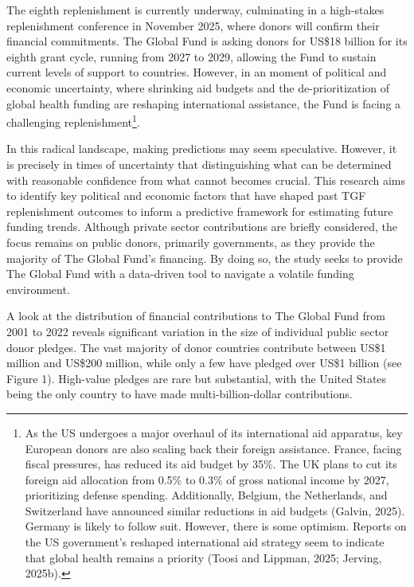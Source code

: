 \documentclass[
]{article}
\begin{document}
The eighth replenishment is currently underway, culminating in a
high-stakes replenishment conference in November 2025, where donors will
confirm their financial commitments. The Global Fund is asking donors
for US\$18 billion for its eighth grant cycle, running from 2027 to
2029, allowing the Fund to sustain current levels of support to
countries. However, in an moment of political and economic uncertainty,
where shrinking aid budgets and the de-prioritization of global health
funding are reshaping international assistance, the Fund is facing a
challenging replenishment\footnote{As the US undergoes a major overhaul
  of its international aid apparatus, key European donors are also
  scaling back their foreign assistance. France, facing fiscal
  pressures, has reduced its aid budget by 35\%. The UK plans to cut its
  foreign aid allocation from 0.5\% to 0.3\% of gross national income by
  2027, prioritizing defense spending. Additionally, Belgium, the
  Netherlands, and Switzerland have announced similar reductions in aid
  budgets (Galvin, 2025). Germany is likely to follow suit. However,
  there is some optimism. Reports on the US government's reshaped
  international aid strategy seem to indicate that global health remains
  a priority (Toosi and Lippman, 2025; Jerving, 2025b).}.

In this radical landscape, making predictions may seem speculative.
However, it is precisely in times of uncertainty that distinguishing
what can be determined with reasonable confidence from what cannot
becomes crucial. This research aims to identify key political and
economic factors that have shaped past TGF replenishment outcomes to
inform a predictive framework for estimating future funding trends.
Although private sector contributions are briefly considered, the focus
remains on public donors, primarily governments, as they provide the
majority of The Global Fund's financing. By doing so, the study seeks to
provide The Global Fund with a data-driven tool to navigate a volatile
funding environment.

A look at the distribution of financial contributions to The Global Fund
from 2001 to 2022 reveals significant variation in the size of
individual public sector donor pledges. The vast majority of donor
countries contribute between US\$1 million and US\$200 million, while
only a few have pledged over US\$1 billion (see Figure 1). High-value
pledges are rare but substantial, with the United States being the only
country to have made multi-billion-dollar contributions.
\end{document}
